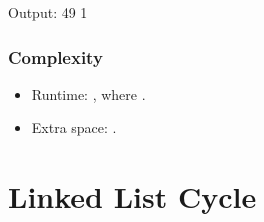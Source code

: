 \documentclass[letterpaper,12pt,english]{book}
\begin{document}
\begin{sphinxVerbatim}[commandchars=\\\{\}]
\end{sphinxVerbatim}

\begin{sphinxVerbatim}[commandchars=\\\{\}]
Output:
49
1
\end{sphinxVerbatim}


\subsubsection{Complexity}
\label{\detokenize{Two_Pointers/08_TP_11_Container_With_Most_Water:id3}}\begin{itemize}
\item {} 
\sphinxAtStartPar
Runtime: , where .

\item {} 
\sphinxAtStartPar
Extra space: .

\end{itemize}

\sphinxstepscope


\section{Linked List Cycle}
\label{\detokenize{Two_Pointers/08_TP_141_Linked_List_Cycle:linked-list-cycle}}\label{\detokenize{Two_Pointers/08_TP_141_Linked_List_Cycle::doc}}
\end{document}
